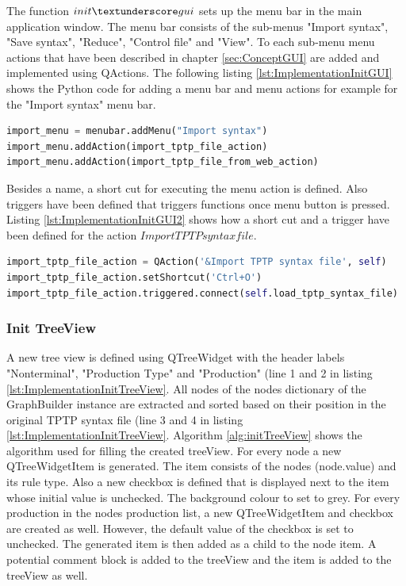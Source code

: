 The function $init\textunderscore gui$ sets up the menu bar in the main application window. The menu bar consists of the sub-menus "Import syntax", "Save syntax", "Reduce", "Control file" and "View". To each sub-menu menu actions that have been described in chapter \ref{sec:ConceptGUI} are added and implemented using QActions. The following listing \ref{lst:ImplementationInitGUI} shows the Python code for adding a menu bar and menu actions for example for the "Import syntax" menu bar.

\begin{lstlisting}[language=Python, basicstyle=\scriptsize	,caption= Implementation of menu bar,label= lst:ImplementationInitGUI]
import_menu = menubar.addMenu("Import syntax")
import_menu.addAction(import_tptp_file_action)
import_menu.addAction(import_tptp_file_from_web_action)
\end{lstlisting}

Besides a name, a short cut for executing the menu action is defined. Also triggers have been defined that triggers functions once menu button is pressed. Listing \ref{lst:ImplementationInitGUI2} shows how a short cut and a trigger have been defined for the action $Import TPTP syntax file$.

\begin{lstlisting}[language=Python, basicstyle=\scriptsize	,caption= Implementation of menu actions,label= lst:ImplementationInitGUI2]
import_tptp_file_action = QAction('&Import TPTP syntax file', self)
import_tptp_file_action.setShortcut('Ctrl+O')
import_tptp_file_action.triggered.connect(self.load_tptp_syntax_file)
\end{lstlisting}


\subsubsection{Init TreeView}\label{sec:ImplementationGUIInitTreeView}
A new tree view is defined using QTreeWidget with the header labels "Nonterminal", "Production Type" and "Production" (line 1 and 2 in listing \ref{lst:ImplementationInitTreeView}.
All nodes of the nodes dictionary of the GraphBuilder instance are extracted and sorted based on their position in the original \ac{TPTP} syntax file (line 3 and 4 in listing \ref{lst:ImplementationInitTreeView}. 
Algorithm \ref{alg:initTreeView} shows the algorithm used for filling the created treeView. For every node a new QTreeWidgetItem is generated. The item consists of the nodes (node.value) and its rule type. Also a new checkbox is defined that is displayed next to the item whose initial value is unchecked. The background colour to set to grey.
For every production in the nodes production list, a new QTreeWidgetItem and checkbox are created as well. However, the default value of the checkbox is set to unchecked. The generated item is then added as a child to the node item. A potential comment block is added to the treeView and the item is added to the treeView as well.

